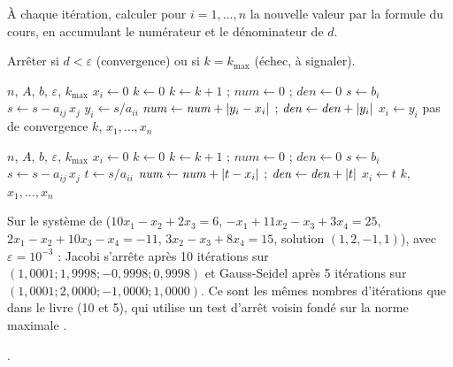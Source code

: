  À chaque itération, calculer pour $i = 1, \dots, n$ la nouvelle valeur
par la formule du cours, en accumulant le numérateur et le dénominateur de $d$.

 Arrêter si $d < \varepsilon$ (convergence) ou si $k = k_{\max}$
(échec, à signaler).

\begin{algo}[ : Jacobi]
  \Require $n$, $A$, $b$, $\varepsilon$, $k_{\max}$
   \State $x_i \leftarrow 0$ \EndFor
  \State $k \leftarrow 0$
  \Repeat
    \State $k \leftarrow k+1$ ; $\mathit{num} \leftarrow 0$ ; $\mathit{den} \leftarrow 0$
      \State $s \leftarrow b_i$
       \State $s \leftarrow s - a_{ij}\,x_j$ \EndFor
      \State $y_i \leftarrow s/a_{ii}$
      \State $\mathit{num} \leftarrow \mathit{num} + \left|y_i - x_i\right|$ ; $\mathit{den} \leftarrow \mathit{den} + \left|y_i\right|$
    \EndFor
     \State $x_i \leftarrow y_i$ \EndFor
   \Print \og pas de convergence \fg{} \EndIf
  \Print $k$, $x_1, \dots, x_n$
\end{algo}

\begin{algo}
  \Require $n$, $A$, $b$, $\varepsilon$, $k_{\max}$
   \State $x_i \leftarrow 0$ \EndFor
  \State $k \leftarrow 0$
  \Repeat
    \State $k \leftarrow k+1$ ; $\mathit{num} \leftarrow 0$ ; $\mathit{den} \leftarrow 0$
      \State $s \leftarrow b_i$
       \State $s \leftarrow s - a_{ij}\,x_j$
      \EndFor
      \State $t \leftarrow s/a_{ii}$
      \State $\mathit{num} \leftarrow \mathit{num} + \left|t - x_i\right|$ ; $\mathit{den} \leftarrow \mathit{den} + \left|t\right|$
      \State $x_i \leftarrow t$
    \EndFor
  \Print $k$, $x_1, \dots, x_n$
\end{algo}

\Verif Sur le système de  ($10x_1 - x_2 + 2x_3 = 6$,
$-x_1 + 11x_2 - x_3 + 3x_4 = 25$, $2x_1 - x_2 + 10x_3 - x_4 = -11$,
$3x_2 - x_3 + 8x_4 = 15$, solution $(1, 2, -1, 1)$), avec
$\varepsilon = 10^{-3}$ : Jacobi s'arrête après 10 itérations sur
$(1{,}0001 ; 1{,}9998 ; -0{,}9998 ; 0{,}9998)$ et Gauss-Seidel après 5 itérations
sur $(1{,}0001 ; 2{,}0000 ; -1{,}0000 ; 1{,}0000)$. Ce sont les mêmes nombres
d'itérations que dans le livre (10 et 5), qui utilise un test d'arrêt voisin
fondé sur la norme maximale .

\Refs {}.
